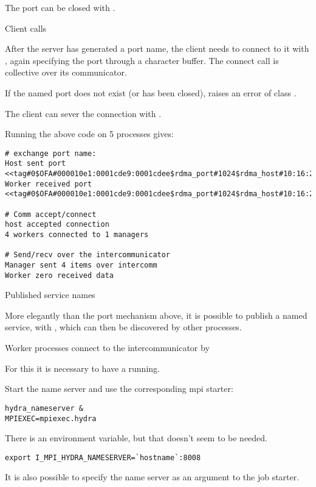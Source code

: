 
The port can be closed with 
.

 {Client calls}

After the server has generated a port name, the client 
needs to connect to it with
, again specifying the port through a character buffer.
The connect call is collective over its communicator.


If the named port does not exist (or has been closed),
 raises an error of class .

The client can sever the connection with
.

Running the above code on 5 processes gives:
\begin{small}
\begin{verbatim}
# exchange port name:
Host sent port <<tag#0$OFA#000010e1:0001cde9:0001cdee$rdma_port#1024$rdma_host#10:16:225:0:1:205:199:254:128:0:0:0:0:0:0$>>
Worker received port <<tag#0$OFA#000010e1:0001cde9:0001cdee$rdma_port#1024$rdma_host#10:16:225:0:1:205:199:254:128:0:0:0:0:0:0$>>

# Comm accept/connect
host accepted connection
4 workers connected to 1 managers

# Send/recv over the intercommunicator
Manager sent 4 items over intercomm
Worker zero received data  
\end{verbatim}
\end{small}

 {Published service names}
\label{sec:mpi-publish}

More elegantly than the port mechanism above,
it is possible to publish a named service, 
with ,
which can then be discovered by other processes.


Worker processes connect to the intercommunicator by


For this it is necessary to have a  running.

\begin{intelnote}
Start the  name server and use the corresponding mpi starter:
\begin{verbatim}
hydra_nameserver &
MPIEXEC=mpiexec.hydra
\end{verbatim}
There is an environment variable, but that doesn't seem to be needed.
\begin{verbatim}
export I_MPI_HYDRA_NAMESERVER=`hostname`:8008
\end{verbatim}
It is also possible to specify the name server as an argument to the job starter.
\end{intelnote}

